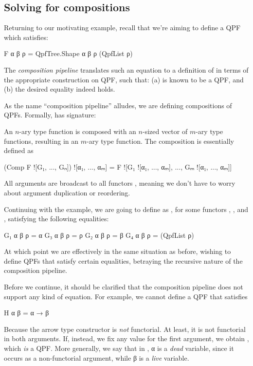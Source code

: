 \subsection{Solving for compositions}%
\label{subsec:comp_pipeline:solving}

Returning to our motivating example, recall that we're aiming to define a QPF  which satisfies:

\begin{leancode}
    F α β ρ = QpfTree.Shape α β ρ (QpfList ρ)
\end{leancode}

The \emph{composition pipeline} translates such an equation to a definition of  in terms of the appropriate construction on QPF, such that: (a)  is known to be a QPF, and (b) the desired equality indeed holds.

As the name ``composition pipeline'' alludes, we are defining compositions of QPFs. Formally,  has signature:
\begin{center}
\end{center}
An $n$-ary type function  is composed with an $n$-sized vector of $m$-ary type functions, resulting in an $m$-ary type function. The composition is essentially defined as
\begin{leancode}
    (Comp F ![G₁, ..., Gₙ]) ![α₁, ..., αₘ] 
                = F ![G₁ ![α₁, ..., αₘ], ..., Gₘ ![α₁, ..., αₘ]]
\end{leancode}
All arguments  are broadcast to all functors , meaning we don't have to worry about argument duplication or reordering.

Continuing with the example, we are going to define  as , for some functors , ,  and , satisfying the following equalities:
\begin{leancode}
    G₁ α β ρ = α                G₃ α β ρ = ρ
    G₂ α β ρ = β                G₄ α β ρ = (QpfList ρ)
\end{leancode}

At which point we are effectively in the same situation as before, wishing to define QPFs 
that satisfy certain equalities, betraying the recursive nature of the composition pipeline.

Before we continue, it should be clarified that the composition pipeline does not support any kind
of equation. For example, we cannot define a QPF that satisfies
\begin{badleancode}
    H α β = α → β 
\end{badleancode}
Because the arrow type constructor  is \emph{not} functorial. 
At least, it is not functorial in both arguments. If, instead, we fix any value  for the
first argument, we obtain , which \emph{is} a QPF.
More generally, we say that in , α is a \emph{dead} variable, since it occurs as a non-functorial argument, while β is a \emph{live} variable.

